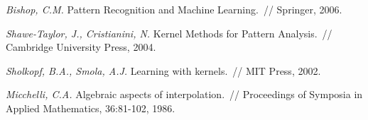 \documentclass[12pt,fleqn]{article}
\begin{document}
\begin{thebibliography}{1}
    \emph{Bishop, C.M.}
    Pattern Recognition and Machine Learning.~//
    Springer, 2006.

    \emph{Shawe-Taylor, J., Cristianini, N.}
    Kernel Methods for Pattern Analysis.~//
    Cambridge University Press, 2004.

    \emph{Sholkopf, B.A., Smola, A.J.}
    Learning with kernels.~//
    MIT Press, 2002.

    \emph{Micchelli, C.A.}
    Algebraic aspects of interpolation.~//
    Proceedings of Symposia in Applied Mathematics, 36:81-102, 1986.
\end{thebibliography}
\end{document}

